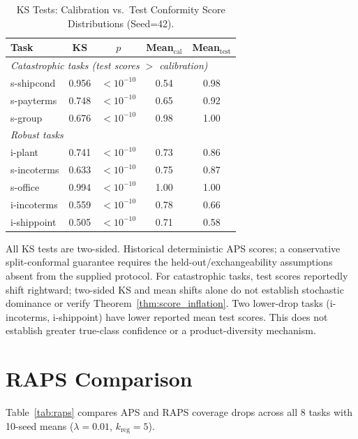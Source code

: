 \documentclass[accepted]{uai2026} %
\begin{document}
\begin{table}[htbp]
\centering
\caption{KS Tests: Calibration vs.\ Test Conformity Score Distributions (Seed=42).}\label{tab:ks}
\small
\begin{tabular}{@{}lcccc@{}}
\toprule
Task & KS & $p$ & Mean$_{\text{cal}}$ & Mean$_{\text{test}}$ \\
\midrule
\multicolumn{5}{l}{\textit{Catastrophic tasks (test scores $>$ calibration)}} \\
s-shipcond & 0.956 & $<10^{-10}$ & 0.54 & 0.98 \\
s-payterms & 0.748 & $<10^{-10}$ & 0.65 & 0.92 \\
s-group & 0.676 & $<10^{-10}$ & 0.98 & 1.00 \\
\midrule
\multicolumn{5}{l}{\textit{Robust tasks}} \\
i-plant & 0.741 & $<10^{-10}$ & 0.73 & 0.86 \\
s-incoterms & 0.633 & $<10^{-10}$ & 0.75 & 0.87 \\
s-office & 0.994 & $<10^{-10}$ & 1.00 & 1.00 \\
i-incoterms & 0.559 & $<10^{-10}$ & 0.78 & 0.66 \\
i-shippoint & 0.505 & $<10^{-10}$ & 0.71 & 0.58 \\
\bottomrule
\end{tabular}


\raggedright
\footnotesize
All KS tests are two-sided. Historical deterministic APS scores; a conservative split-conformal guarantee requires the held-out/exchangeability assumptions absent from the supplied protocol. For catastrophic tasks, test scores reportedly shift rightward; two-sided KS and mean shifts alone do not establish stochastic dominance or verify Theorem~\ref{thm:score_inflation}. Two lower-drop tasks (i-incoterms, i-shippoint) have lower reported mean test scores. This does not establish greater true-class confidence or a product-diversity mechanism.
\end{table}

\section{RAPS Comparison}\label{app:raps}

Table~\ref{tab:raps} compares APS and RAPS coverage drops across all 8 tasks with 10-seed means ($\lambda=0.01$, $k_{\text{reg}}=5$).
\end{document}
